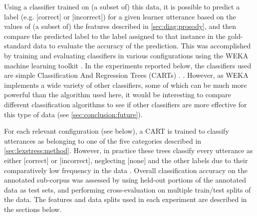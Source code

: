 		 Using a classifier trained on (a subset of) this data, it is possible to predict a label (e.g. [correct] or [incorrect]) for a given learner utterance based on the values of (a subset of) the features described in \cref{sec:diag:prosody}, and then compare the predicted label to the label assigned to that instance in the gold-standard data to evaluate the accuracy of the prediction. 
		This was accomplished by training and evaluating classifiers in various configurations using the WEKA machine learning toolkit \citep{Hall2009}. 	
		In the experiments reported below, 
		the classifiers used are
		simple Classification And Regression Trees (CARTs) \citep{Breiman1984}. 
		. 
		However, as WEKA implements a wide variety of other classifiers, some of which can be much more powerful than the algorithm used here, it would be interesting to compare different classification algorithms to see if other classifiers are more effective for this type of data (see \cref{sec:conclusion:future}).
		
		For each relevant configuration (see below), a CART is trained to classify utterances as belonging to one of the five categories described in \cref{sec:lexstress:method}. However, in practice these trees classify every utterance as either [correct] or [incorrect], neglecting [none] and the other labels due to their comparatively low frequency in the data .
		Overall classification accuracy on the annotated sub-corpus was assessed by using held-out portions of the annotated data as test sets, and performing cross-evaluation on multiple train/test splits of the data. The features and data splits used in each experiment are described in the sections below. 


